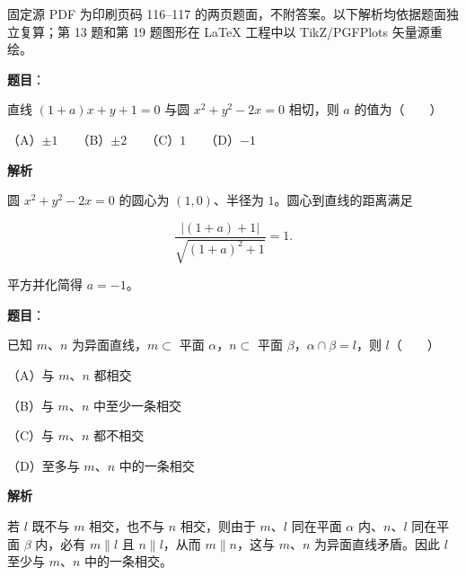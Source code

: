 

\begin{gktip}
固定源 PDF 为印刷页码 116–117 的两页题面，不附答案。以下解析均依据题面独立复算；第 13 题和第 19 题图形在 LaTeX 工程中以 TikZ/PGFPlots 矢量源重绘。
\end{gktip}


\begin{answer}

\textbf{题目}：

直线 $(1+a)x+y+1=0$ 与圆 $x^2+y^2-2x=0$ 相切，则 $a$ 的值为\mbox{（　　）}

（A）$\pm1$　　（B）$\pm2$　　（C）$1$　　（D）$-1$

\textbf{解析}

圆 $x^2+y^2-2x=0$ 的圆心为 $(1,0)$、半径为 $1$。圆心到直线的距离满足

\nopagebreak[4]
\[
\frac{|(1+a)+1|}{\sqrt{(1+a)^2+1}}=1.
\]

平方并化简得 $a=-1$。


\end{answer}
\begin{answer}

\textbf{题目}：

已知 $m\text{、}n$ 为异面直线，$m\subset$ 平面 $\alpha$，$n\subset$ 平面 $\beta$，$\alpha\cap\beta=l$，则 $l$\mbox{（　　）}

（A）与 $m\text{、}n$ 都相交

（B）与 $m\text{、}n$ 中至少一条相交

（C）与 $m\text{、}n$ 都不相交

（D）至多与 $m\text{、}n$ 中的一条相交

\textbf{解析}

若 $l$ 既不与 $m$ 相交，也不与 $n$ 相交，则由于 $m\text{、}l$ 同在平面 $\alpha$ 内、$n\text{、}l$ 同在平面 $\beta$ 内，必有 $m\parallel l$ 且 $n\parallel l$，从而 $m\parallel n$，这与 $m\text{、}n$ 为异面直线矛盾。因此 $l$ 至少与 $m\text{、}n$ 中的一条相交。


\end{answer}
